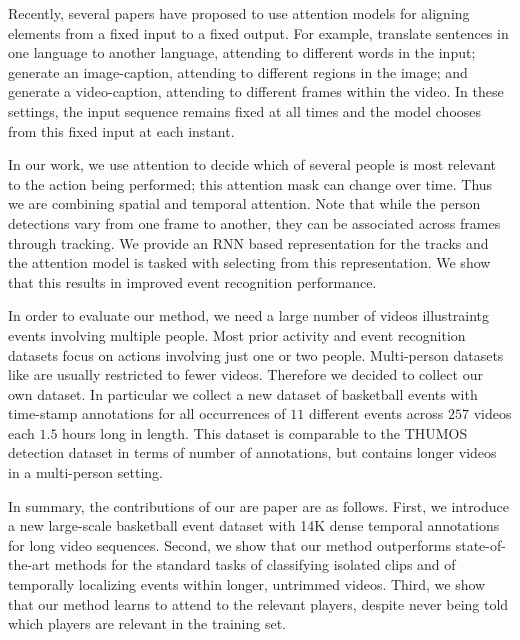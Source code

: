 Recently, several papers have proposed to use attention models for aligning
elements from a fixed input to a fixed output.  For example,
\cite{Bahdnau_arxiv14} translate sentences in one language to another language,
attending to different words in the input; \cite{Xu_arxiv15} generate an image-caption,
attending to different regions in the image; and
\cite{Yao_arxiv15} generate a video-caption, attending to different
frames within the video.  In these settings, the input sequence remains fixed
at all times and the model chooses from this fixed input at each instant.

In our work, we use attention to decide which of several people is most
relevant to the action being performed; this attention mask can change over
time. Thus we are combining spatial and temporal attention.  Note that while
the person detections vary from one frame to another, they can be associated
across frames through tracking. We provide an RNN based representation for the
tracks and the attention model is tasked with selecting from this
representation. We show that this results in improved event recognition
performance.

In order to evaluate our method, we need a large number of videos illustraintg
events involving multiple people. Most prior activity and event
recognition datasets focus on actions involving just one or two people.
Multi-person datasets like \cite{Ryoo_ICCV09,VIRAT,Choi_ICCV09} are usually restricted to fewer videos.
Therefore we decided to collect our own dataset.
In particular we collect a new dataset of basketball events with time-stamp annotations for
all occurrences of $11$ different events across $257$ videos each $1.5$ hours
long in length.  This dataset is comparable to the THUMOS \cite{THUMOS}
detection dataset in terms of number of annotations, but contains longer videos
in a multi-person setting.

In summary, the contributions of our are paper are as follows.  First, we
introduce a new  large-scale basketball event dataset with 14K dense temporal
annotations for long video sequences.  Second, we show that our method
outperforms state-of-the-art methods for the standard tasks of classifying
isolated clips and of temporally localizing events within longer, untrimmed
videos.  Third, we show that our method learns to attend to the relevant
players, despite never being told which players are relevant in the training
set.
